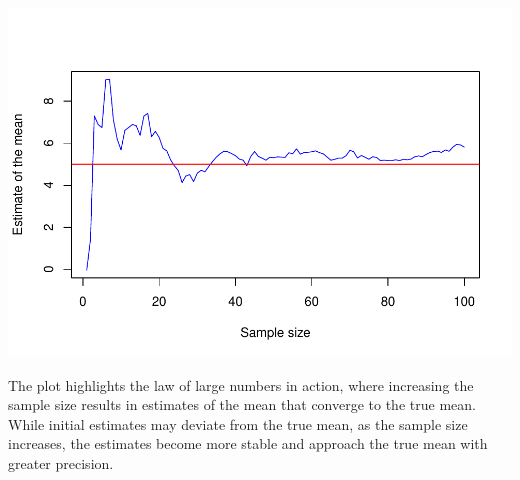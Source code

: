\documentclass{article}
\begin{document}
\includegraphics{RMarkdown_files/figure-latex/global_options2-1.pdf}

The plot highlights the law of large numbers in action, where increasing
the sample size results in estimates of the mean that converge to the
true mean. While initial estimates may deviate from the true mean, as
the sample size increases, the estimates become more stable and approach
the true mean with greater precision.

\newpage
\end{document}
